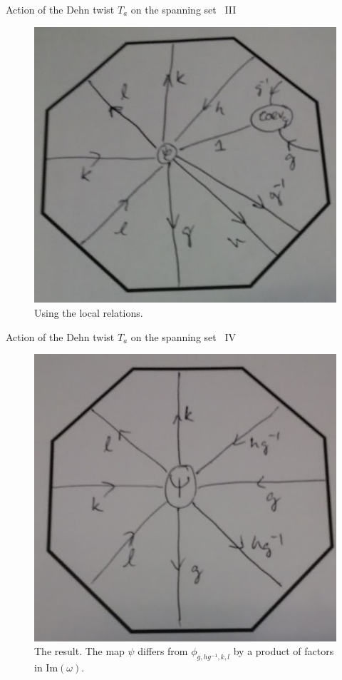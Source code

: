 \documentclass{beamer}
\renewcommand{\Im}{\mathrm{Im}}
\begin{document}
\begin{frame}{Action of the Dehn twist $T_a$ on the spanning set \, III}
\begin{figure}[h]
\centering
\includegraphics[height=0.7\textheight]{3.jpeg}
\caption{Using the local relations.}
\end{figure}
\end{frame}


\begin{frame}{Action of the Dehn twist $T_a$ on the spanning set \, IV}
\begin{figure}[h]
\centering
\includegraphics[height=0.7\textheight]{4.jpeg}
\caption{The result. The map $\psi$ differs from $\phi_{g,hg^{-1},k,l}$ by a product of factors in $\Im(\omega)$.}
\end{figure}
\end{frame}
\end{document}
